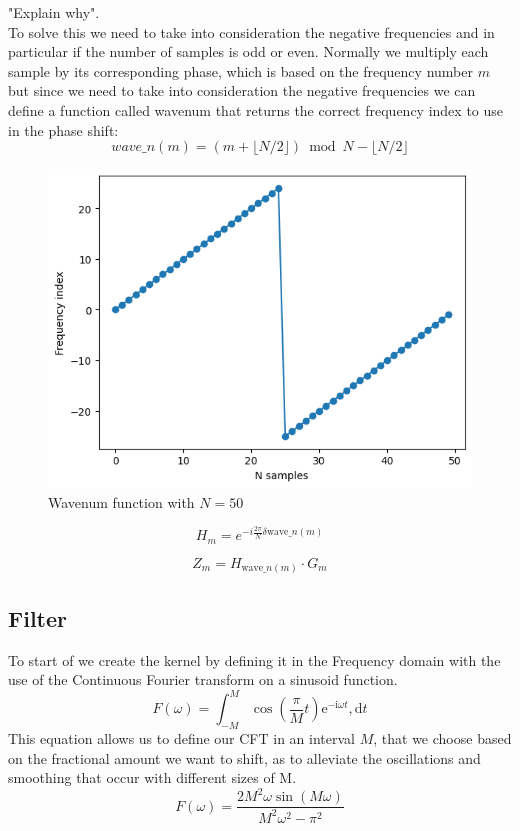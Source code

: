 \documentclass[]{usiinfbachelorproject}
\begin{document}
	"Explain why".\\
	To solve this we need to take into consideration the negative frequencies and in particular if the number of samples is odd or even.
	Normally we multiply each sample by its corresponding phase, which is based on the frequency number $m$
	but since we need to take into consideration the negative frequencies we can define a function called wavenum that returns the correct frequency index to use in the phase shift:
	\begin{equation*}
		wave\_n(m) = (m + \lfloor N/2 \rfloor ) \bmod N - \lfloor N/2 \rfloor
	\end{equation*}
	
	\begin{figure}[h]
		\centering
		\includegraphics[width=0.5\columnwidth]{images/wavenum_n50.png}
		\caption{Wavenum function with $N=50$}
	\end{figure}
	
	\begin{equation*}
		H_m = e^{-i \frac{2\pi}{N}  \delta \text{wave}\_n(m)}
	\end{equation*}
	
	\begin{equation}\label{phase_shift_equation}
		Z_m = H_{\text{wave}\_n(m)} \cdot G_m
	\end{equation}	
	
	
	
	\subsection{Filter}
	To start of we create the kernel by defining it in the Frequency domain with the use of the Continuous Fourier transform on a sinusoid function.
	\begin{equation}
		F(\omega) = \int_{-M}^{M} \cos(\frac{\pi}{M}t)\mathrm{e}^{-\mathrm{i}\omega t},\mathrm{d}t
	\end{equation}
	This equation allows us to define our CFT in an interval $M$, that we choose based on the fractional amount we want to shift, as to alleviate the oscillations and smoothing that occur with different sizes of M.
	\begin{equation}\label{filter_formula}
		F(\omega) = \frac{2M^2\omega \sin(M\omega)}{M^2\omega^2-\pi^2}
	\end{equation}
	
\end{document}
